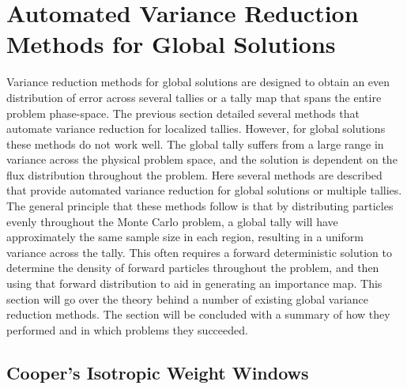 \section{Automated Variance Reduction Methods for Global Solutions}
\label{sec:GlobalVR}

Variance reduction methods for global solutions are designed to obtain an even
distribution of error across several tallies or a tally map that spans the
entire problem phase-space.
The previous section detailed several methods that automate variance reduction
for localized tallies. However, for global solutions these methods do not work
well. The global tally suffers from a large range in variance across the
physical problem space, and the solution is dependent on the flux distribution
throughout the problem. Here several methods are described that provide
automated variance reduction for global solutions or multiple tallies. The
general principle that these methods follow is that by distributing particles
evenly throughout the Monte Carlo problem, a global tally will have
approximately the same sample size in each region, resulting in a uniform
variance across the tally. This often requires a forward deterministic solution
to determine the density of forward particles throughout the problem, and then
using that forward distribution to aid in generating an importance map. This
section will go over the theory behind a number of existing global variance
reduction methods. The section will be concluded with a summary of how they
performed and in which problems they succeeded.

\subsection{Cooper's Isotropic Weight Windows}
\label{subsec:CooperGlobal}


